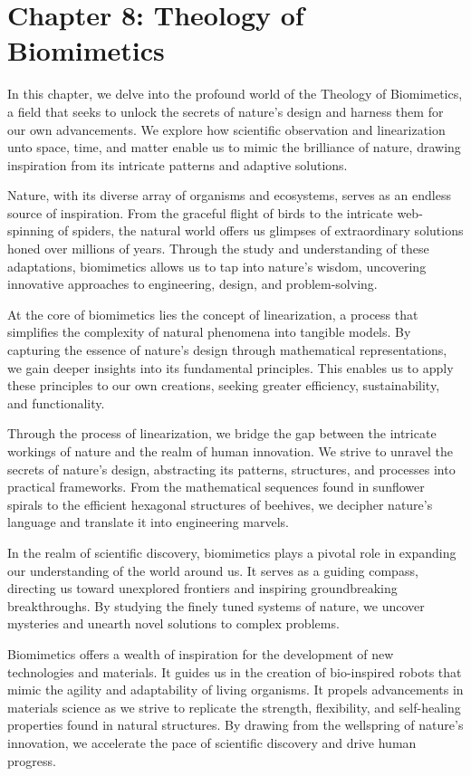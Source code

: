 \documentclass[ebook,12pt,oneside,openany]{memoir}
\begin{document}
\chapter*{Chapter 8: Theology of Biomimetics}


\indent \indent In this chapter, we delve into the profound world of the Theology of Biomimetics, a field that seeks to unlock the secrets of nature's design and harness them for our own advancements. We explore how scientific observation and linearization unto space, time, and matter enable us to mimic the brilliance of nature, drawing inspiration from its intricate patterns and adaptive solutions.

\indent Nature, with its diverse array of organisms and ecosystems, serves as an endless source of inspiration. From the graceful flight of birds to the intricate web-spinning of spiders, the natural world offers us glimpses of extraordinary solutions honed over millions of years. Through the study and understanding of these adaptations, biomimetics allows us to tap into nature's wisdom, uncovering innovative approaches to engineering, design, and problem-solving.

\indent At the core of biomimetics lies the concept of linearization, a process that simplifies the complexity of natural phenomena into tangible models. By capturing the essence of nature's design through mathematical representations, we gain deeper insights into its fundamental principles. This enables us to apply these principles to our own creations, seeking greater efficiency, sustainability, and functionality.

\indent Through the process of linearization, we bridge the gap between the intricate workings of nature and the realm of human innovation. We strive to unravel the secrets of nature's design, abstracting its patterns, structures, and processes into practical frameworks. From the mathematical sequences found in sunflower spirals to the efficient hexagonal structures of beehives, we decipher nature's language and translate it into engineering marvels.

\indent In the realm of scientific discovery, biomimetics plays a pivotal role in expanding our understanding of the world around us. It serves as a guiding compass, directing us toward unexplored frontiers and inspiring groundbreaking breakthroughs. By studying the finely tuned systems of nature, we uncover mysteries and unearth novel solutions to complex problems.

\indent Biomimetics offers a wealth of inspiration for the development of new technologies and materials. It guides us in the creation of bio-inspired robots that mimic the agility and adaptability of living organisms. It propels advancements in materials science as we strive to replicate the strength, flexibility, and self-healing properties found in natural structures. By drawing from the wellspring of nature's innovation, we accelerate the pace of scientific discovery and drive human progress.
\end{document}
